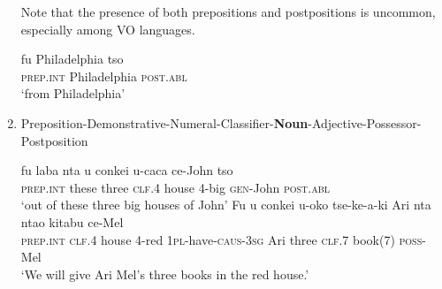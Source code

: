 \documentclass[12pt, oneside]{article}
\begin{document}
\begin{enumerate}
Note that the presence of both prepositions and postpositions is uncommon, especially among VO languages.
\begin{exe}
\ex
\gll fu Philadelphia tso \\
\textsc{prep.int} Philadelphia \textsc{post.abl} \\
\trans `from Philadelphia'
\end{exe}
\item Preposition-Demonstrative-Numeral-Classifier-\textbf{Noun}-Adjective-Possessor-Postposition
\begin{exe}
\ex
\gll fu laba nta u conkei u-caca ce-John tso \\
\textsc{prep.int} these three \textsc{clf.4} house 4-big \textsc{gen}-John \textsc{post.abl} \\
\trans `out of these three big houses of John'
\ex
\gll Fu u conkei u-\textbeltl oko tse-ke-\textbeltl a-ki Ari nta nta\textbeltl o kitabu ce-Mel \\
\textsc{prep.int} \textsc{clf.4} house 4-red \textsc{1pl}-have-\textsc{caus}-\textsc{3sg} Ari three \textsc{clf}.7 book(7) \textsc{poss}-Mel \\
\trans `We will give Ari Mel's three books in the red house.'
\end{exe}

\end{enumerate}
\end{document}

